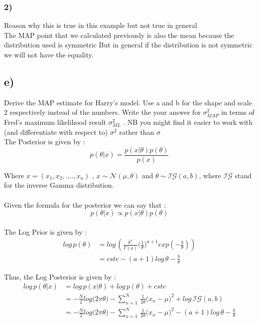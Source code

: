 \documentclass[12pt,twoside]{article}
\begin{document}
\subsubsection*{2)} Reason why this is true in this example but not true in general\\
The MAP point that we calculated previously is also the mean because the distribution used is symmetric But in general if the distribution is not symmetric we will not have the equality.

\subsection*{e)} Derive the MAP estimate for Harry’s model. Use a and b for the shape and scale 2 respectively instead of the numbers. Write the your answer for $\sigma_{MAP}^2$ in terms of Fred’s maximum likelihood result $\sigma_{ML}^2$ . NB you might find it easier to work with (and differentiate with respect to) $\sigma^2$ rather than $\sigma$\\


The Posterior is given by :
\begin{equation*}
p(\theta|x) = \frac{p(x|\theta)p(\theta)}{p(x)}
\end{equation*}

Where $x =(x_1,x_2,....,x_n)$ , $x \sim \mathcal{N}(\mu, \theta)$ and $\theta \sim \mathcal{IG}(a, b)$, where $\mathcal{IG}$ stand for the inverse Gamma distribution.\\\\
Given the formula for the posterior we can say that : 
\begin{equation*}
p(\theta|x) \propto p(x|\theta)p(\theta)
\end{equation*}
\\

The Log Prior is given by :
\begin{align*}
log \, p(\theta) &= log \, \left(\frac{b^a}{\Gamma(a)} \big(\frac{1}{\theta}\big)^{a+1}exp(-\frac{b}{\theta})\right) \\
                 &= cste -(a+1)log \, \theta - \frac{b}{\theta}
\end{align*}

Thus, the Log Posterior is given by :
\begin{align*}
log \, p(\theta|x) &= log \, p(x|\theta) + log \, p(\theta) + cste \\
&= -\frac{N}{2} log\big(2 \pi \theta) - \sum_{n=1}^{N}  \,  \frac{1}{2 \theta}\big(x_n - \mu\big)^2  + log \, \mathcal{IG}(a, b)\\
&= -\frac{N}{2} log\big(2 \pi \theta \big) - \sum_{n=1}^{N}  \,  \frac{1}{2 \theta}\big(x_n - \mu\big)^2 -(a+1)log \, \theta - \frac{b}{\theta} \\
\end{align*}
\end{document}
